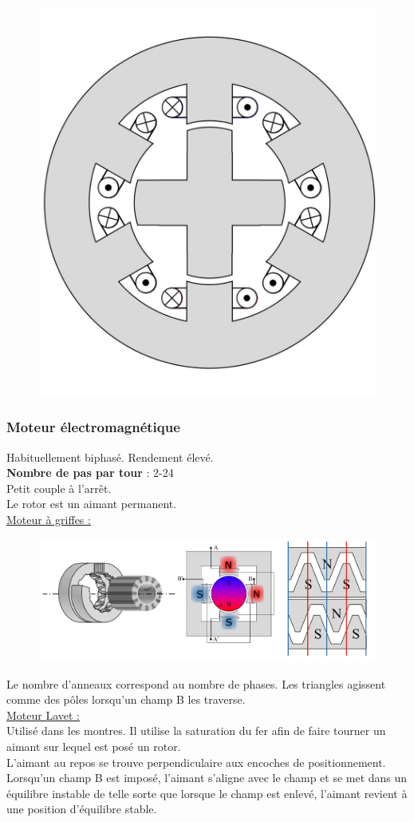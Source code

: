 \documentclass[../main.tex]{subfiles}
\begin{document}
\begin{figure}[hbt!]
    \centering
    \includegraphics[width=.3\textwidth]{IMAGES/machineelec/IMG_0158.jpeg}
\end{figure}

\subsubsection{Moteur électromagnétique}
Habituellement biphasé. Rendement élevé.\\
\textbf{Nombre de pas par tour} : 2-24\\
Petit couple à l'arrêt.\\

Le rotor est un aimant permanent. \\

\quad \underline{Moteur à griffes :}\\

\begin{figure}[hbt!]
    \centering
    \includegraphics[width=.6\textwidth]{IMAGES/machineelec/IMG_0159.jpeg}
\end{figure}

Le nombre d'anneaux correspond au nombre de phases. Les triangles agissent comme des pôles lorsqu'un champ B les traverse.\\

\quad \underline{Moteur Lavet :}\\
Utilisé dans les montres. Il utilise la saturation du fer afin de faire tourner un aimant sur lequel est posé un rotor.\\
L'aimant au repos se trouve perpendiculaire aux encoches de positionnement. Lorsqu'un champ B est imposé, l'aimant s'aligne avec le champ et se met dans un équilibre instable de telle sorte que lorsque le champ est enlevé, l'aimant revient à une position d'équilibre stable.\\
\end{document}
